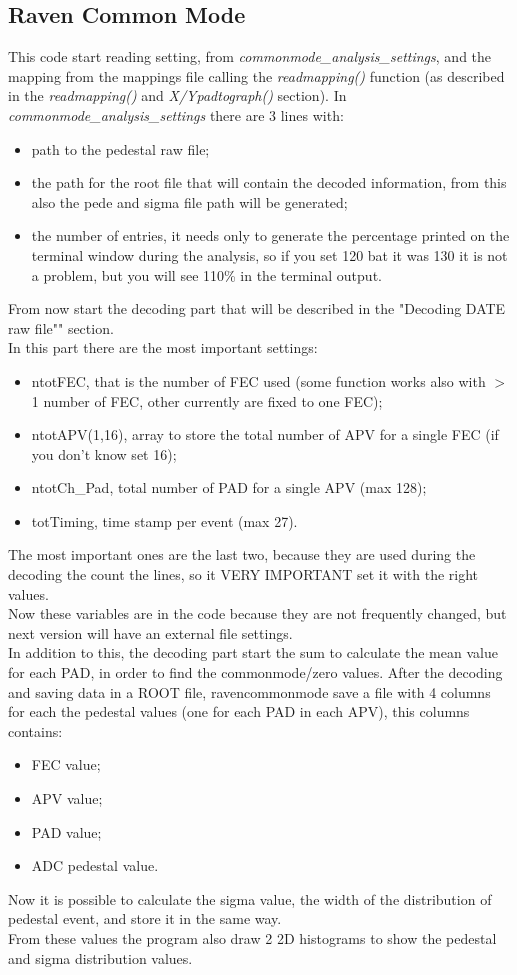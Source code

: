 \documentclass[a4paper,12pt]{article}
\begin{document}
	 	\subsection{Raven Common Mode}
 			This code start reading setting, from \textit{commonmode\_analysis\_settings}, and the mapping from the mappings file calling the \textit{readmapping()} function (as described in the \textit{readmapping()} and \textit{X/Ypadtograph()} section). 
 			In \textit{commonmode\_analysis\_settings} there are 3 lines with:
 			\begin{itemize}
 				\item path to the pedestal raw file;
 				\item the path for the root file that will contain the decoded information, from this also the pede and sigma file path will be generated;
 				\item the number of entries, it needs only to generate the percentage printed on the terminal window during the analysis, so if you set 120 bat it was 130 it is not a problem, but you will see 110\% in the terminal output.
 			\end{itemize}
 			From now start the decoding part that will be described in the "Decoding DATE raw file"" section.\\
 			In this part there are the most important settings:
 			\begin{itemize}
 				\item ntotFEC, that is the number of FEC used (some function works also with $>$1 number of FEC, other currently are fixed to one FEC);
				\item ntotAPV(1,16), array to store the total number of APV for a single FEC (if you don't know set 16);
				\item ntotCh\_Pad, total number of PAD for a single APV (max 128);
				\item totTiming, time stamp per event (max 27).
 			\end{itemize}
 			The most important ones are the last two, because they are used during the decoding the count the lines, so it VERY IMPORTANT set it with the right values.\\
 			Now these variables are in the code because they are not frequently changed, but next version will have an external file settings.\\
 			In addition to this, the decoding part start the sum to calculate the mean value for each PAD, in order to find the commonmode/zero values.
 			After the decoding and saving data in a ROOT file, ravencommonmode save a file with 4 columns for each the pedestal values (one for each PAD in each APV), this columns contains:
 			\begin{itemize}
 				\item FEC value;
 				\item APV value;
 				\item PAD value;
 				\item ADC pedestal value.
 			\end{itemize}
 			Now it is possible to calculate the sigma value, the width of the distribution of pedestal event, and store it in the same way.\\
 			From these values the program also draw 2 2D histograms to show the pedestal and sigma distribution values.
\end{document}
